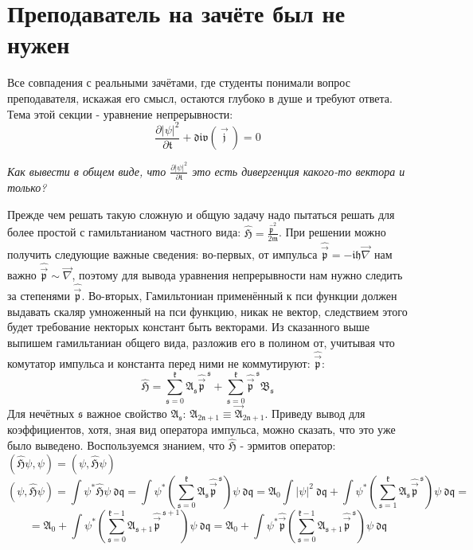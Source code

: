\section{Преподаватель на зачёте был не нужен}
\par Все совпадения с реальными зачётами, где студенты понимали вопрос преподавателя, искажая его смысл, остаются глубоко в душе и требуют ответа. Тема этой секции - уравнение непрерывности: $$\mathfrak{\frac{\partial |\psi|^2 }{\partial t} + div \! \left( \ \! \vec{j} \ \! \right) = 0 }$$
\begin{center}
    \textit{ Как вывести в общем виде, что $\mathfrak{\frac{\partial |\psi|^2 }{\partial t}}$ это есть дивергенция какого-то вектора и только? } 
\end{center}
\par Прежде чем решать такую сложную и общую задачу надо пытаться решать для более простой с гамильтанианом частного вида: $\mathfrak{ \hat{H} = \frac{\hat{p}^2}{2m}}$. При решении можно получить следующие важные сведения: во-первых, от импульса $\mathfrak{\hat{\vec{p}} = -i h \vec{\nabla}} $ нам важно  $\mathfrak{\hat{\vec{p}} \sim \vec{\nabla}}$, поэтому для вывода уравнения непрерывности нам нужно следить за степенями $\mathfrak{\hat{\vec{p}}}$. Во-вторых, Гамильтониан применённый к пси функции должен выдавать скаляр умноженный на пси функцию, никак не вектор, следствием этого будет требование некторых констант быть векторами. Из сказанного выше выпишем гамильтаниан общего вида, разложив его в полином от, учитывая что комутатор импульса и константа перед ними не коммутируют: $\mathfrak{\hat{\vec{p}}}$:
$$ \mathfrak{ \hat{H} = \sum_{s=0}^{k} A_s  \hat{\vec{p}}^{ \ s} + \sum_{s=0}^{k}  \hat{\vec{p}}^{ \ s} B_s  }  $$
Для нечётных $\mathfrak{s}$ важное свойство $\mathfrak{A_s}$: $ \mathfrak{ A_{2n+1} \equiv{} \vec{A}_{2n+1}}$. Приведу вывод для коэффициентов, хотя, зная вид оператора импульса, можно сказать, что это уже было выведено. Воспользуемся знанием, что $\mathfrak{\hat{{H}}}$ - эрмитов оператор: $\mathfrak{ \left(  \hat{H} \psi, \psi \right) = \left( \psi, \hat{H} \psi \right)} $
 $$ \mathfrak{ \left(   \psi, \hat{H} \psi \right) = \int \psi^* \hat{H} \psi \ dq = \int \psi^* \left( \sum_{s=0}^{k} A_s   \hat{\vec{p}}^{ \ s} \right)  \psi \ dq  =A_0 \int |\psi|^2 \ dq + \int \psi^* \left( \sum_{s=1}^{k} A_s   \hat{\vec{p}}^{ \ s} \right)  \psi \ dq} = $$
 $$ \mathfrak{ = A_0 + \int \psi^* \left( \sum_{s=0}^{k-1} A_{s+1}   \hat{\vec{p}}^{ \ s+1} \right)  \psi \ dq = A_0 + \int \psi^* \hat{\vec{p}}  \left( \sum_{s=0}^{k-1} A_{s+1}   \hat{\vec{p}}^{ \ s} \right)  \psi \ dq }$$
